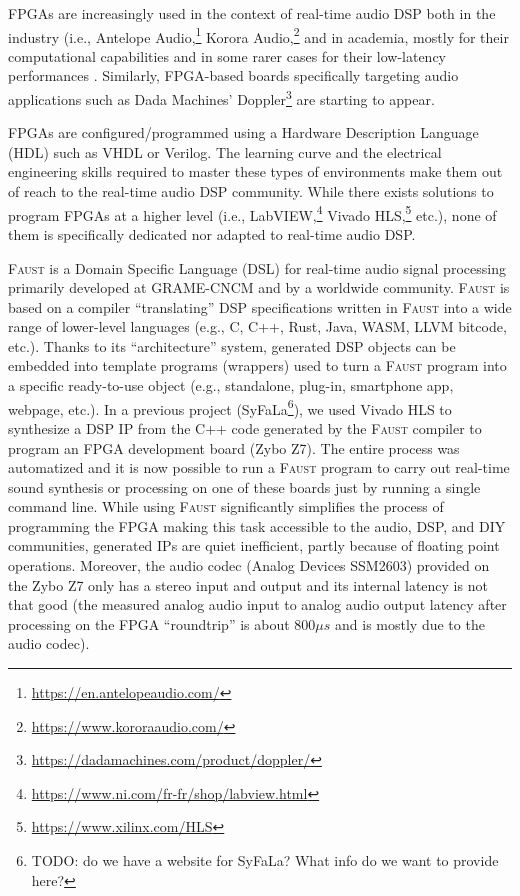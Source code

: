 \documentclass[a4paper,10pt]{article}
\newcommand{\F}{\textsc{Faust}}
\begin{document}
FPGAs are increasingly used in the context of real-time audio DSP both in the industry (i.e., Antelope Audio,\footnote{\url{https://en.antelopeaudio.com/}} Korora Audio,\footnote{\url{https://www.kororaaudio.com/}} and in academia, mostly for their computational capabilities \cite{Choi2013,Pfeifle2012} and in some rarer cases for their low-latency performances \cite{Verstraelen2014}. Similarly, FPGA-based boards specifically targeting audio applications such as Dada Machines' Doppler\footnote{\url{https://dadamachines.com/product/doppler/}} are starting to appear. 

FPGAs are configured/programmed using a Hardware Description Language (HDL) such as VHDL or Verilog. The learning curve and the electrical engineering skills required to master these types of environments make them out of reach to the real-time audio DSP community. While there exists solutions to program FPGAs at a higher level (i.e., LabVIEW,\footnote{\url{https://www.ni.com/fr-fr/shop/labview.html}} Vivado HLS,\footnote{\url{https://www.xilinx.com/HLS}} etc.), none of them is specifically dedicated nor adapted to real-time audio DSP. 

\F{} \cite{Orlarey2009} is a Domain Specific Language (DSL) for real-time audio signal processing primarily developed at GRAME-CNCM and by a worldwide community. \F{} is based on a compiler ``translating'' DSP specifications written in \F{} into a wide range of lower-level languages (e.g., C, C++, Rust, Java, WASM, LLVM bitcode, etc.). Thanks to its ``architecture'' system, generated DSP objects can be embedded into template programs (wrappers) used to turn a \F{} program into a specific ready-to-use object (e.g., standalone, plug-in, smartphone app, webpage, etc.). In a previous project (SyFaLa\footnote{TODO: do we have a website for SyFaLa? What info do we want to provide here?}), we used Vivado HLS to synthesize a DSP IP from the C++ code generated by the \F{} compiler to program an FPGA development board (Zybo Z7). The entire process was automatized and it is now possible to run a \F{} program to carry out real-time sound synthesis or processing on one of these boards just by running a single command line. While using \F{} significantly simplifies the process of programming the FPGA making this task accessible to the audio, DSP, and DIY communities, generated IPs are quiet inefficient, partly because of floating point operations. Moreover, the audio codec (Analog Devices SSM2603) provided on the Zybo Z7 only has a stereo input and output and its internal latency is not that good (the measured analog audio input to analog audio output latency after processing on the FPGA ``roundtrip'' is about $800\mu s$ and is mostly due to the audio codec).
\end{document}
